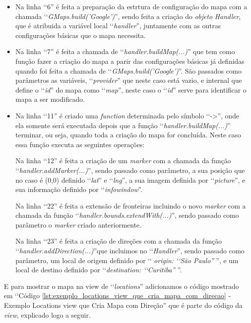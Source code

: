 \begin{itemize}

 \item Na linha ‘‘6'' é feita a preparação da estrtura de configuração do mapa com a chamada 
 ‘‘\emph{GMaps.build('Google')}'', sendo feita a criação do \emph{objeto Handler}, que é atribuida a 
 variável local ‘‘\emph{handler}'', juntamente com as outras configurações básicas que o mapa necessita.
 
 \item Na linha ‘‘7'' é feita a chamada de ‘‘\emph{handler.buildMap(...)}'' que tem como função fazer a 
 criação do mapa a parir das configurações básicas já definidas quando foi feita a chamada de 
 ‘‘\emph{GMaps.build('Google')}''. São passados como parâmetros as variáveis, ‘‘\emph{provider}''
 que neste caso está vazio, e internal que define o ‘‘\emph{id}'' do mapa como ‘‘\emph{map}'', neste caso
 o ‘‘\emph{id}'' serve para identificar o mapa a ser modificado.
 
 \item Na linha ‘‘11'' é criado uma \emph{function} determinada pelo símbolo ‘‘->'', onde ela somente será 
 executada depois que a função ‘‘\emph{handler.buildMap(...)}'' terminar, ou seja, quando toda a criação do mapa for 
 concluída. Neste caso essa função executa as seguintes operações:
 
  \subitem Na linha ‘‘12'' é feita a criação de um \emph{marker} com a chamada da função 
  ‘‘\emph{handler.addMarker(...)}'', sendo passado como parâmetro, a sua posição que no caso é (0,0) 
  definido ‘‘\emph{lat}'' e ‘‘\emph{lng}'', a sua imagem definida por ‘‘\emph{picture}'', e sua informação 
  definido por ‘‘\emph{infowindow}''.
 
  \subitem Na linha ‘‘22'' é feita a extensão de fronteiras incluindo o novo \emph{marker} com a chamada 
  da função ‘‘\emph{handler.bounds.extendWith(...)}'', sendo passado como parâmetro o \emph{marker} criado
  anteriormente.
 
  \subitem Na linha ‘‘23'' é feita a criação de direções com a chamada da função 
  ‘‘\emph{handler.addDirection(...)}''que incluimos no ‘‘\emph{Handler}'', sendo passado como parâmetro, um 
  local de origem definido por ‘‘\emph{ origin: ‘‘São Paulo''} '', e um local de destino definido por 
  ‘‘\emph{destination: ‘‘Curitiba''} ''.
 
\end{itemize}

E para mostrar o mapa na view de ‘‘\emph{locations}'' adicionamos o código mostrado em ‘‘Código 
\ref{lst:exemplo_locations_view_que_cria_mapa_com_direcao} - Exemplo Locations view que Cria Mapa com Direção'' 
que é parte do código da \emph{view}, explicado logo a seguir.

